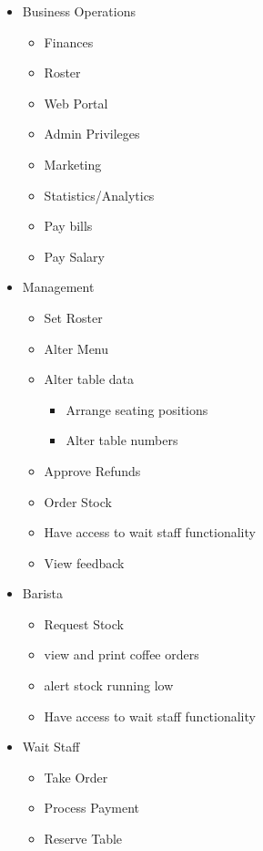 \documentclass{article}
\begin{document}
\begin{itemize}
    \item {Business Operations}
    \begin{itemize}
        \item {Finances}
        \item {Roster}
        \item {Web Portal}
        \item {Admin Privileges}
        \item {Marketing}
        \item {Statistics/Analytics}
        \item Pay bills
        \item Pay Salary
    \end{itemize}
    \item {Management}
    \begin{itemize}
        \item {Set Roster}
        \item {Alter Menu}
        \item {Alter table data}
        \begin{itemize}
            \item {Arrange seating positions}
            \item {Alter table numbers}
        \end{itemize}
        \item {Approve Refunds}
        \item {Order Stock}
        \item {Have access to wait staff functionality}
        \item View feedback
    \end{itemize}
    \item {Barista}
    \begin{itemize}
        \item {Request Stock}
        \item view and print coffee orders
        \item alert stock running low
        \item {Have access to wait staff functionality}
    \end{itemize}
    \item {Wait Staff}
    \begin{itemize}
        \item {Take Order}
        \item {Process Payment}
        \item {Reserve Table}

\end{itemize}
\end{itemize}
\end{document}
